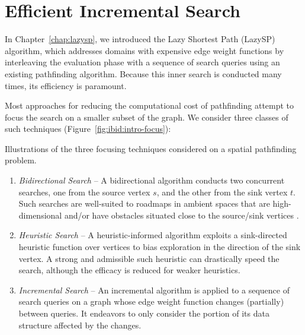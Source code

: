 \chapter{Efficient Incremental Search}
\label{chap:ibid}

In Chapter~\ref{chap:lazysp},
we introduced the Lazy Shortest Path (LazySP) algorithm,
which addresses domains with expensive edge weight functions
by interleaving the evaluation phase with a sequence of 
search queries using an existing pathfinding algorithm.
Because this inner search is conducted many times,
its efficiency is paramount.

Most approaches for reducing the computational cost of pathfinding
attempt to focus the search on a smaller subset of the graph.
We consider three classes of such techniques
(Figure~\ref{fig:ibid:intro-focus}):

\begin{marginfigure}[5cm]%
   \centering%
   
   
   
   \caption{Illustrations of the three focusing techniques considered
      on a spatial pathfinding problem.}%
   \label{fig:ibid:intro-focus}
\end{marginfigure}

\begin{enumerate}
\item \emph{Bidirectional Search} -- A bidirectional algorithm
   conducts two concurrent searches,
   one from the source vertex $s$,
   and the other from the sink vertex $t$.
   Such searches are well-suited to roadmaps in ambient spaces that
   are high-dimensional  and/or have
   obstacles situated close to the source/sink vertices
   .
\item \emph{Heuristic Search} -- A heuristic-informed algorithm
   exploits a sink-directed heuristic function over vertices to bias
   exploration in the direction of the sink vertex.
   A strong and admissible such heuristic can drastically speed the
   search,
   although the efficacy is reduced for weaker heuristics.
\item \emph{Incremental Search} -- An incremental algorithm
   is applied to a sequence of search queries on a graph whose
   edge weight function changes (partially) between queries.
   It endeavors to only consider the portion of its data structure
   affected by the changes.
\end{enumerate}

